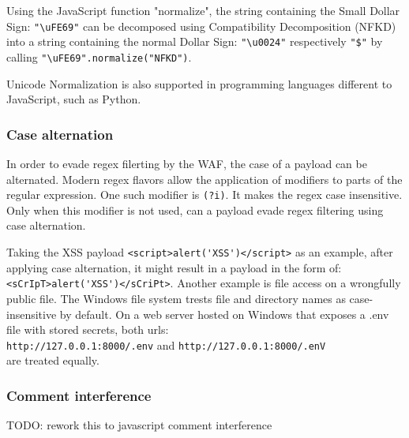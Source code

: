 Using the JavaScript function "normalize", the string containing the Small Dollar Sign: \verb|"\uFE69"| can be decomposed using Compatibility Decomposition (NFKD) into a string containing the normal Dollar Sign: \verb|"\u0024"| respectively \verb|"$"| by calling \verb|"\uFE69".normalize("NFKD")|.

Unicode Normalization is also supported in programming languages different to JavaScript, such as Python. \cite{python/normalization}


\subsubsection{Case alternation}
In order to evade regex filerting by the WAF, the case of a payload can be alternated. \cite{medium/allypetitt}
Modern regex flavors allow the application of modifiers to parts of the regular expression.
One such modifier is \verb|(?i)|. It makes the regex case insensitive. \cite{regex/jan} Only when this modifier is not used, can a payload evade regex filtering using case alternation.

Taking the XSS payload \verb|<script>alert('XSS')</script>| as an example, after applying case alternation, it might result in a payload in the form of: \verb|<sCrIpT>alert('XSS')</sCriPt>|.
Another example is file access on a wrongfully public file.
The Windows file system trests file and directory names as case-insensitive by default. \cite{windows/casesensitive}
On a web server hosted on Windows that exposes a .env file with stored secrets, both urls: \\ \verb|http://127.0.0.1:8000/.env| and \verb|http://127.0.0.1:8000/.enV| \\
are treated equally.


\subsubsection{Comment interference}
\label{sec:commint}
{\color{red} TODO: rework this to javascript comment interference}




